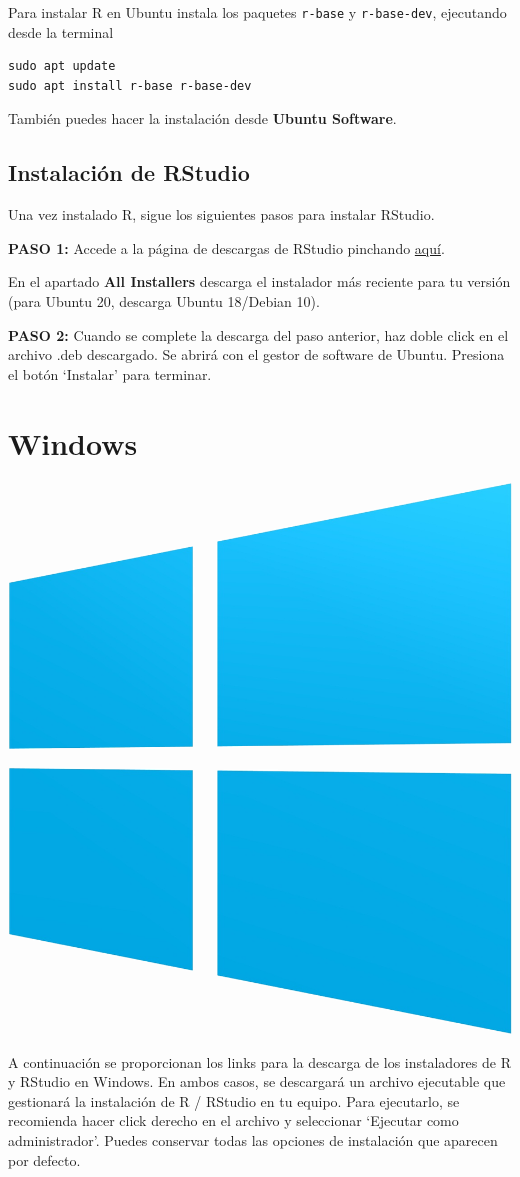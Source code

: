\documentclass[spanish,]{article}
\begin{document}
Para instalar R en Ubuntu instala los paquetes \texttt{r-base} y \texttt{r-base-dev}, ejecutando desde la terminal

\begin{verbatim}
sudo apt update
sudo apt install r-base r-base-dev 
\end{verbatim}

También puedes hacer la instalación desde \textbf{Ubuntu Software}.

\hypertarget{instalaciuxf3n-de-rstudio}{%
\subsection{Instalación de RStudio}\label{instalaciuxf3n-de-rstudio}}

Una vez instalado R, sigue los siguientes pasos para instalar RStudio.

\textbf{PASO 1: }
Accede a la página de descargas de RStudio pinchando \href{https://rstudio.com/products/rstudio/download/\#download}{aquí}.

En el apartado \textbf{All Installers} descarga el instalador más reciente para tu versión (para Ubuntu 20, descarga Ubuntu 18/Debian 10).

\textbf{PASO 2: }
Cuando se complete la descarga del paso anterior, haz doble click en el archivo .deb descargado. Se abrirá con el gestor de software de Ubuntu. Presiona el botón `Instalar' para terminar.

\hypertarget{windows}{%
\section{Windows}\label{windows}}

\begin{center}\includegraphics[width=0.15\linewidth]{images/os/windows} \end{center}

A continuación se proporcionan los links para la descarga de los instaladores de R y RStudio en Windows. En ambos casos, se descargará un archivo ejecutable que gestionará la instalación de R / RStudio en tu equipo. Para ejecutarlo, se recomienda hacer click derecho en el archivo y seleccionar `Ejecutar como administrador'. Puedes conservar todas las opciones de instalación que aparecen por defecto.
\end{document}
